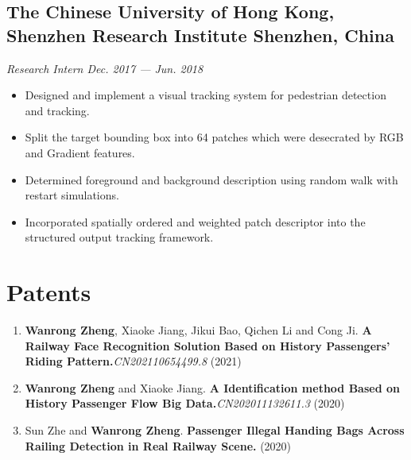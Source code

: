 \documentclass[a4,10pt]{article}
\newcommand{\subtext}[1]{
#1\par\vspace{-0.2cm}}
\newenvironment{zitemize}{
\begin{itemize}\itemsep0pt \parskip0pt \parsep1pt}
{\end{itemize}\vspace{-0.5cm}}
\begin{document}
\subsection*{The Chinese University of Hong Kong, Shenzhen Research Institute \hfill Shenzhen, China} 
\subtext{\textit{Research Intern \hfill Dec. 2017 --- Jun. 2018} }
    \begin{zitemize}
        \item Designed and implement a visual tracking system for pedestrian detection and tracking. 
        \item Split the target bounding box into 64 patches which were desecrated by RGB and Gradient features.  
        \item Determined foreground and background description using random walk with restart simulations. 
        \item Incorporated spatially ordered and weighted patch descriptor into the structured output tracking framework.
    \end{zitemize}




\section{Patents}
\begin{enumerate}[leftmargin=*]
  \item \textbf{Wanrong Zheng}, Xiaoke Jiang, Jikui Bao, Qichen Li and Cong Ji. \textbf{A Railway Face Recognition Solution Based on History Passengers' Riding Pattern.}\textit{CN202110654499.8} (2021)
  
  \item \textbf{Wanrong Zheng} and Xiaoke Jiang. \textbf{A Identification method Based on History Passenger Flow Big Data.}\textit{CN202011132611.3} (2020)
  
  \item Sun Zhe and \textbf{Wanrong Zheng}. \textbf{Passenger Illegal Handing Bags Across Railing Detection in Real Railway Scene.} (2020)
  
\end{enumerate}
\end{document}
